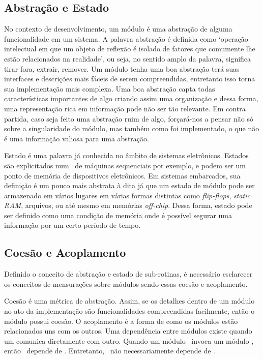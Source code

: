 	\subsection{Abstração e Estado}
		No contexto de desenvolvimento, um módulo é uma abstração de alguma funcionalidade em um sistema.
		A palavra abstração é definida como `operação intelectual em que um objeto de reflexão é isolado de fatores que comumente lhe estão relacionados na realidade', ou seja, no sentido amplo da palavra, significa tirar fora, extrair, remover.
		Um módulo tenha uma boa abstração terá suas interfaces e descrições mais fáceis de serem compreendidas, entretanto isso torna sua implementação mais complexa.
		Uma boa abstração capta todas características importantes de algo criando assim uma organização e dessa forma, uma representação rica em informação pode não ser tão relevante.
		Em contra partida, caso seja feito uma abstração ruim de algo, forçará-nos a pensar não só sobre a singularidade do módulo, mas também como foi implementado, o que não é uma informação valiosa para uma abstração.

		Estado é uma palavra já conhecida no âmbito de sistemas eletrônicos. Estados são explicitados num \design\ de máquinas sequenciais por exemplo, e podem ser um ponto de memória de dispositivos eletrônicos.
		Em sistemas embarcados, sua definição é um pouco mais abstrata à dita já que um estado de módulo pode ser armazenado em vários lugares em várias formas distintas como \textit{flip-flops}, \textit{static RAM}, arquivos, ou até mesmo em memórias \textit{off-chip}. Dessa forma, estado pode ser definido como uma condição de memória onde é possível segurar uma informação por um certo período de tempo.

	\subsection{Coesão e Acoplamento}
		Definido o conceito de abstração e estado de sub-rotinas, é necessário esclarecer os conceitos de mensurações sobre módulos sendo essas coesão e acoplamento.

		Coesão é uma métrica de abstração. Assim, se os detalhes dentro de um módulo no ato da implementação são funcionalidades compreendidas facilmente, então o módulo possui coesão.
		O acoplamento é a forma de como os módulos estão relacionados uns com os outros. Uma dependência entre módulos existe quando um comunica diretamente com outro. Quando um módulo \A\ invoca um módulo \B, então \A\ depende de \B. Entretanto, \B\ não necessariamente depende de \A.

